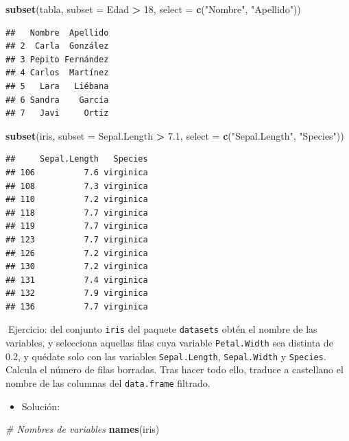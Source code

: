 \documentclass[11pt,]{book}
\newenvironment{Shaded}{\begin{snugshade}}{\end{snugshade}}
\newcommand{\CommentTok}[1]{\textcolor[rgb]{0.37,0.37,0.37}{\textit{#1}}}
\newcommand{\DataTypeTok}[1]{\textcolor[rgb]{0.27,0.27,0.27}{#1}}
\newcommand{\DecValTok}[1]{\textcolor[rgb]{0.06,0.06,0.06}{#1}}
\newcommand{\FloatTok}[1]{\textcolor[rgb]{0.06,0.06,0.06}{#1}}
\newcommand{\KeywordTok}[1]{\textcolor[rgb]{0.27,0.27,0.27}{\textbf{#1}}}
\newcommand{\NormalTok}[1]{#1}
\newcommand{\OperatorTok}[1]{\textcolor[rgb]{0.43,0.43,0.43}{\textbf{#1}}}
\newcommand{\StringTok}[1]{\textcolor[rgb]{0.5,0.5,0.5}{#1}}
\providecommand{\tightlist}{%
  \setlength{\itemsep}{0pt}\setlength{\parskip}{0pt}}
\begin{document}
\begin{Shaded}
\begin{Highlighting}[]
\KeywordTok{subset}\NormalTok{(tabla, }\DataTypeTok{subset =}\NormalTok{ Edad }\OperatorTok{>}\StringTok{ }\DecValTok{18}\NormalTok{, }\DataTypeTok{select =} \KeywordTok{c}\NormalTok{(}\StringTok{"Nombre"}\NormalTok{, }\StringTok{"Apellido"}\NormalTok{))}
\end{Highlighting}
\end{Shaded}

\begin{verbatim}
##   Nombre  Apellido
## 2  Carla  González
## 3 Pepito Fernández
## 4 Carlos  Martínez
## 5   Lara   Liébana
## 6 Sandra    García
## 7   Javi     Ortiz
\end{verbatim}

\begin{Shaded}
\begin{Highlighting}[]
\KeywordTok{subset}\NormalTok{(iris, }\DataTypeTok{subset =}\NormalTok{ Sepal.Length }\OperatorTok{>}\StringTok{ }\FloatTok{7.1}\NormalTok{, }\DataTypeTok{select =} \KeywordTok{c}\NormalTok{(}\StringTok{"Sepal.Length"}\NormalTok{, }\StringTok{"Species"}\NormalTok{))}
\end{Highlighting}
\end{Shaded}

\begin{verbatim}
##     Sepal.Length   Species
## 106          7.6 virginica
## 108          7.3 virginica
## 110          7.2 virginica
## 118          7.7 virginica
## 119          7.7 virginica
## 123          7.7 virginica
## 126          7.2 virginica
## 130          7.2 virginica
## 131          7.4 virginica
## 132          7.9 virginica
## 136          7.7 virginica
\end{verbatim}

📝Ejercicio: del conjunto \texttt{iris} del paquete \texttt{datasets} obtén el nombre de las variables, y selecciona aquellas filas cuya variable \texttt{Petal.Width} sea distinta de 0.2, y quédate solo con las variables \texttt{Sepal.Length}, \texttt{Sepal.Width} y \texttt{Species}. Calcula el número de filas borradas. Tras hacer todo ello, traduce a castellano el nombre de las columnas del \texttt{data.frame} filtrado.

\begin{itemize}
\tightlist
\item
  Solución:
\end{itemize}

\begin{Shaded}
\begin{Highlighting}[]
\CommentTok{# Nombres de variables}
\KeywordTok{names}\NormalTok{(iris)}
\end{Highlighting}
\end{Shaded}
\end{document}
